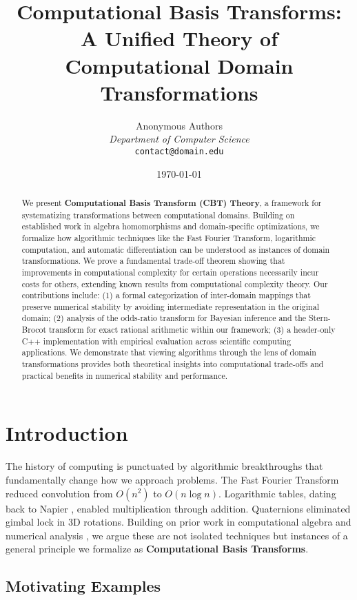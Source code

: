 \documentclass[12pt,a4paper]{article}
\title{Computational Basis Transforms:\\
A Unified Theory of Computational Domain Transformations}
\author{
    Anonymous Authors\\
    \textit{Department of Computer Science}\\
    \texttt{contact@domain.edu}
}
\date{\today}
\theoremstyle{definition}
\begin{document}
\maketitle

\begin{abstract}
We present \textbf{Computational Basis Transform (CBT) Theory}, a framework for systematizing transformations between computational domains. Building on established work in algebra homomorphisms and domain-specific optimizations, we formalize how algorithmic techniques like the Fast Fourier Transform, logarithmic computation, and automatic differentiation can be understood as instances of domain transformations. We prove a fundamental trade-off theorem showing that improvements in computational complexity for certain operations necessarily incur costs for others, extending known results from computational complexity theory. Our contributions include: (1) a formal categorization of inter-domain mappings that preserve numerical stability by avoiding intermediate representation in the original domain; (2) analysis of the odds-ratio transform for Bayesian inference and the Stern-Brocot transform for exact rational arithmetic within our framework; (3) a header-only C++ implementation with empirical evaluation across scientific computing applications. We demonstrate that viewing algorithms through the lens of domain transformations provides both theoretical insights into computational trade-offs and practical benefits in numerical stability and performance.
\end{abstract}

\section{Introduction}

The history of computing is punctuated by algorithmic breakthroughs that fundamentally change how we approach problems. The Fast Fourier Transform \cite{cooley1965algorithm} reduced convolution from $O(n^2)$ to $O(n \log n)$. Logarithmic tables, dating back to Napier \cite{napier1614mirifici}, enabled multiplication through addition. Quaternions \cite{hamilton1844quaternions} eliminated gimbal lock in 3D rotations. Building on prior work in computational algebra \cite{cohen2003computer} and numerical analysis \cite{higham2002accuracy}, we argue these are not isolated techniques but instances of a general principle we formalize as \textbf{Computational Basis Transforms}.

\subsection{Motivating Examples}
\end{document}
